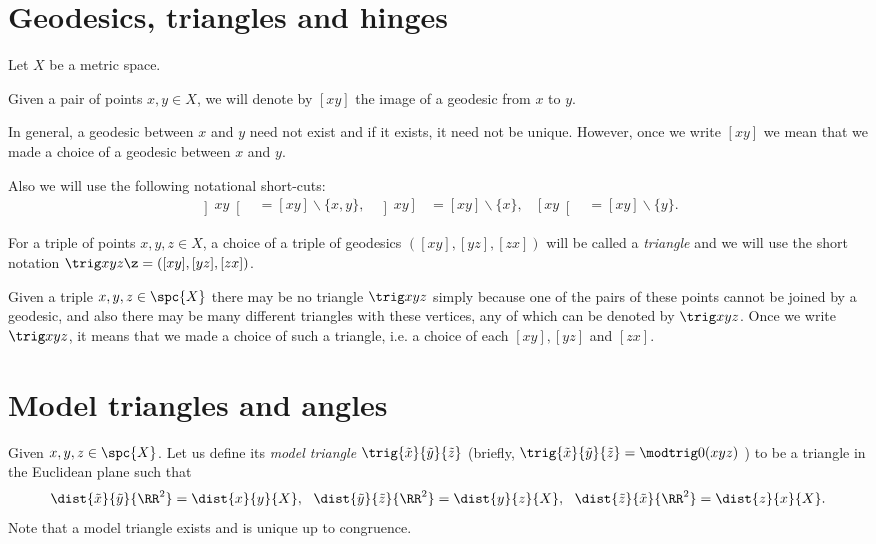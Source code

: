 

\section{Geodesics, triangles and hinges}

Let $X$ be a metric space.

Given a pair of points $x,y\in X$,
we will denote by $[xy]$ the image of a geodesic from $x$ to $y$. 

In general, a geodesic between $x$ and $y$ need not exist and if it exists, it need not be unique.  However,  once we write $[x y]$ we mean that we made a choice of a geodesic between $x$ and $y$.

Also we will use the following notational short-cuts:
\begin{align*}
\left] x y \right[&=[xy]\backslash\{x,y\},
&
\left] x y \right]&=[xy]\backslash\{x\},
&
\left[ x y \right[&=[xy]\backslash\{y\}.
\end{align*}

For a triple of points $x,y,z\in X$, 
a choice of a triple of geodesics $([x y], [y z], [z x])$ will be called a \emph{triangle} and we will use the short notation 
$\trig x y z \z=([x y], [y z], [z x])$.

Given a triple $x,y,z\in \spc{X}$ there may be no triangle 
$\trig x y z$ simply because one of the pairs of these points cannot be joined by a geodesic, and also there may be many different triangles with these vertices, any of which can be denoted by $\trig x y z$.
Once we write $\trig x y z$, it means that we made a choice of such a triangle, 
i.e. a choice of each $[x y], [y z]$ and $[z x]$.

\section{Model triangles and angles}

Given 
$x,y,z\in \spc{X}$. 
Let us define its \emph{model triangle} $\trig{\tilde x}{\tilde y}{\tilde z}$ 
(briefly, 
$\trig{\tilde x}{\tilde y}{\tilde z}=\modtrig0(x y z)$%
) to be a triangle in the Euclidean plane  such that
\[\dist{\tilde x}{\tilde y}{\RR^2}=\dist{x}{y}{X},
\ \ \dist{\tilde y}{\tilde z}{\RR^2}=\dist{y}{z}{X},
\ \ \dist{\tilde z}{\tilde x}{\RR^2}=\dist{z}{x}{X}.\]
Note that a model triangle exists and is unique up to congruence.

